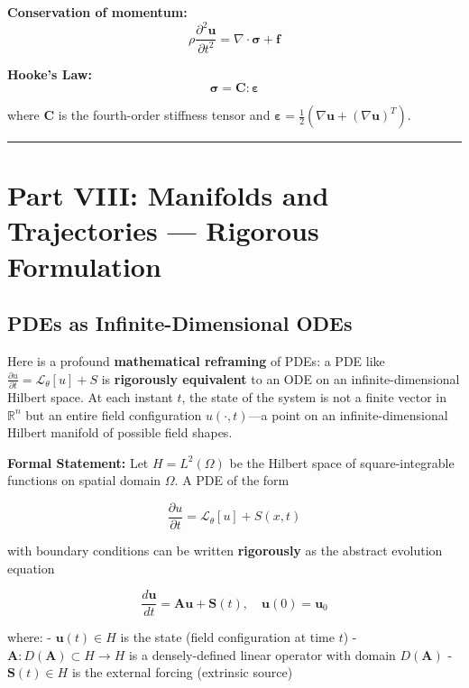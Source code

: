 \documentclass[
]{article}
\begin{document}
\textbf{Conservation of momentum:}
\[\rho \frac{\partial^2 \mathbf{u}}{\partial t^2} = \nabla \cdot \boldsymbol{\sigma} + \mathbf{f}\]

\textbf{Hooke's Law:}
\[\boldsymbol{\sigma} = \mathbf{C} : \boldsymbol{\varepsilon}\]

where \(\mathbf{C}\) is the fourth-order stiffness tensor and
\(\boldsymbol{\varepsilon} = \frac{1}{2}(\nabla\mathbf{u} + (\nabla\mathbf{u})^T)\).

\begin{center}\rule{0.5\linewidth}{0.5pt}\end{center}

\section{Part VIII: Manifolds and Trajectories --- Rigorous
Formulation}\label{part-viii-manifolds-and-trajectories-rigorous-formulation}

\subsection{PDEs as Infinite-Dimensional
ODEs}\label{pdes-as-infinite-dimensional-odes}

Here is a profound \textbf{mathematical reframing} of PDEs: a PDE like
\(\frac{\partial u}{\partial t} = \mathcal{L}_\theta[u] + S\) is
\textbf{rigorously equivalent} to an ODE on an infinite-dimensional
Hilbert space. At each instant \(t\), the state of the system is not a
finite vector in \(\mathbb{R}^n\) but an entire field configuration
\(u(\cdot, t)\)---a point on an infinite-dimensional Hilbert manifold of
possible field shapes.

\textbf{Formal Statement:} Let \(H = L^2(\Omega)\) be the Hilbert space
of square-integrable functions on spatial domain \(\Omega\). A PDE of
the form

\[\frac{\partial u}{\partial t} = \mathcal{L}_\theta[u] + S(x,t)\]

with boundary conditions can be written \textbf{rigorously} as the
abstract evolution equation

\[\frac{d\mathbf{u}}{dt} = \mathbf{A}\mathbf{u} + \mathbf{S}(t), \quad \mathbf{u}(0) = \mathbf{u}_0\]

where: - \(\mathbf{u}(t) \in H\) is the state (field configuration at
time \(t\)) - \(\mathbf{A}: D(\mathbf{A}) \subset H \to H\) is a
densely-defined linear operator with domain \(D(\mathbf{A})\) -
\(\mathbf{S}(t) \in H\) is the external forcing (extrinsic source)
\end{document}
